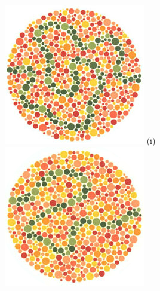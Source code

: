 \documentclass[	12pt, Times, openright, twoside, a4paper, english, brazil]{abntex2}
\begin{document}
\begin{apendicesenv}
\begin{figure}[!htb]
\centering
{\includegraphics[width=\linewidth]{ishihara-fuga/plate30.jpg}}
(i)
\endminipage\hfill
{}
\centering
{\includegraphics[width=\linewidth]{ishihara-fuga/plate31.jpg}}

\end{figure}
\end{apendicesenv}
\end{document}
